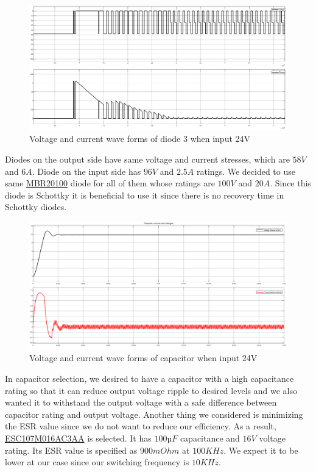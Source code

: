 \documentclass{article}
\newcommand\tab[1][1cm]{\hspace*{#1}}
\begin{document}
\begin{figure}[H]
    \centering
    \includegraphics[scale=0.3]{24diode3.png}
    \caption{Voltage and current wave forms of diode 3 when input 24V}
    \label{fig:my_label}
\end{figure}

\tab Diodes on the output side have same voltage and current stresses, which are $58 V$ and $6 A$. Diode on the input side has $96 V$ and $2.5 A$ ratings. We decided to use same \href{https://www.direnc.net/mbr20100-diyot--20a-100v-dual-high-voltage-schottky}{MBR20100} diode for all of them whose ratings are $100 V$ and $20 A$. Since this diode is Schottky it is beneficial to use it since there is no recovery time in Schottky diodes.

\begin{figure}[H]
    \centering
    \includegraphics[scale=0.3]{capacitor24.png}
    \caption{Voltage and current wave forms of capacitor when input 24V}
    \label{fig:my_label}
\end{figure}
\tab In capacitor selection, we desired to have a capacitor with a high capacitance rating so that it can reduce output voltage ripple to desired levels and we also wanted it to withstand the output voltage with a safe difference between capacitor rating and output voltage. Another thing we considered is minimizing the ESR value since we do not want to reduce our efficiency. As a result, \href{https://www.digikey.com/product-detail/en/kemet/ESC107M016AC3AA/399-6080-ND/2712569}{ESC107M016AC3AA} is selected. It has $100 µF$ capacitance and $16 V$ voltage rating. Its ESR value is specified as $900 mOhm$ at $100 KHz$. We expect it to be lower at our case since our switching frequency is $10 KHz$.
\end{document}
